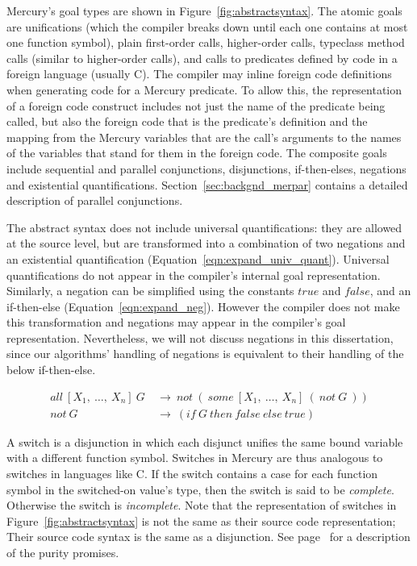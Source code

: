 \noindent
Mercury's goal types are shown in Figure~\ref{fig:abstractsyntax}.
The atomic goals are unifications
(which the compiler breaks down until each one contains
at most one function symbol),
plain first-order calls,
higher-order calls,
typeclass method calls (similar to higher-order calls),
and calls to predicates defined by code in a foreign language (usually C).
The compiler may inline foreign code definitions when generating code
for a Mercury predicate.
To allow this, the representation of a foreign code construct includes
not just the name of the predicate being called,
but also the foreign code that is the predicate's definition
and the mapping from the Mercury variables that are the call's arguments
to the names of the variables that stand for them in the foreign code.
The composite goals include
sequential and parallel conjunctions,
disjunctions, if-then-elses, negations and existential quantifications.
Section~\ref{sec:backgnd_merpar} contains a detailed description of parallel
conjunctions.

The abstract syntax does not include universal quantifications:
they are allowed at the source level,
but are transformed into a combination of two negations and an existential
quantification
(Equation~\ref{eqn:expand_univ_quant}).
Universal quantifications do not appear in the compiler's internal goal
representation.
Similarly,
a negation can be simplified using the constants $true$ and $false$,
and an if-then-else (Equation~\ref{eqn:expand_neg}).
However the compiler does not make this transformation and
negations may appear in the compiler's goal representation.
Nevertheless, we will not discuss negations in this dissertation,
since our algorithms' handling of negations is equivalent
to their handling of the below if-then-else.

\begin{align}
all~[X_1,~\ldots,~X_n]~G~&\rightarrow~not~(~some~[X_1,~\ldots,~X_n]~(~not~G~))
\label{eqn:expand_univ_quant}
\\
not~G~&\rightarrow~(if~G~then~false~else~true)
\label{eqn:expand_neg}
\end{align}

A switch is a disjunction in which
each disjunct unifies the same bound variable
with a different function symbol.
Switches in Mercury are thus analogous to switches in languages like C.
If the switch contains a case for each function symbol in the
switched-on value's type, then the switch is said to be \emph{complete}.
Otherwise the switch is \emph{incomplete}.
Note that the representation of switches in Figure~\ref{fig:abstractsyntax}
is not the same as their source code representation;
Their source code syntax is the same as a disjunction.
See page~\pageref{page:purity} for a description of the purity promises.

